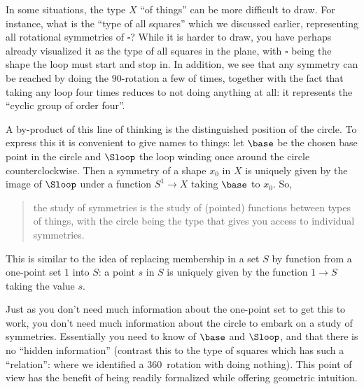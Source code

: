 In some situations, the type $X$ ``of things'' can be more difficult to draw.  For instance, what is the ``type of all squares'' which we discussed earlier, representing all rotational symmetries of $\square$?  While it is harder to draw, you have perhaps already visualized it as the type of all squares in the plane, with $\square$ being the shape the loop must start and stop in.  In addition, we see that any symmetry can be reached by doing the $90$\textdegree-rotation a few of times, together with the fact that taking any loop four times reduces to not doing anything at all: it represents the ``cyclic group of order four''.


A by-product of this line of thinking is the distinguished position of the circle. To express this it is convenient to give names to things: let $\base$ be the chosen base point in the circle and $\Sloop$ the loop winding once around the circle counterclockwise. Then a symmetry of a shape $x_0$ in $X$ is uniquely given by the image of $\Sloop $ under a function $S^1\to X$ taking $\base$ to $x_0$. So,
\begin{quote}
  the study of symmetries is the study of (pointed) functions between types of things, with the circle being the type that gives you access to individual symmetries.
\end{quote}

This is similar to the idea of replacing membership in a set $S$ by function from a one-point set $1$ into $S$: a point $s$ in $S$ is uniquely given by the function $1\to S$ taking the value $s$.


Just as you don't need much information about the one-point set to get this to work, you don't need much information about the circle to embark on a study of symmetries.
Essentially you need to know of $\base $ and $\Sloop $, and that there is no ``hidden information'' (contrast this to the type of squares which has such a ``relation'': where we identified a $360$\textdegree\ rotation with doing nothing).  This point of view has the benefit of being readily formalized while offering geometric intuition.

